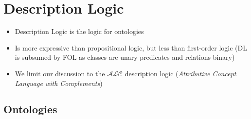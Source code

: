 \section{Description Logic}
\begin{itemize}
	\item Description Logic is the logic for ontologies
	\item Is more expressive than propositional logic, but less than first-order logic (DL is subsumed by FOL as classes are unary predicates and relations binary)
	\item We limit our discussion to the $\mathcal{ALC}$ description logic (\textit{Attributive Concept Language with Complements})
\end{itemize}
\subsection{Ontologies}
